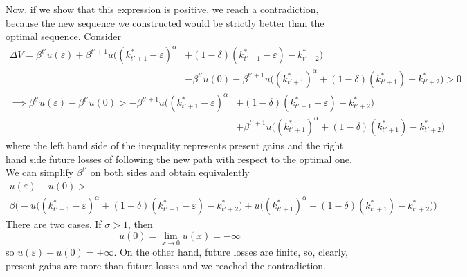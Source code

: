 Now, if we show that this expression is positive, we reach a contradiction, because the new sequence we constructed would be strictly better than the optimal sequence.
Consider
\begin{align*}
\Delta V = \beta ^{t'} u(\varepsilon) + \beta^{t' + 1}u \big((k_{t'+1}^* -\varepsilon)^\alpha &+ (1- \delta)(k_{t'+1}^* -\varepsilon) - k_{t' + 2}^*\big) \\& - \beta ^{t'} u(0) - \beta^{t' + 1}u \big((k_{t'+1}^*)^\alpha + (1- \delta)(k_{t'+1}^*) - k_{t' + 2}^*\big) > 0 \end{align*}\begin{align*}
\implies \beta ^{t'} u(\varepsilon) - \beta ^{t'} u(0)> - \beta^{t' + 1}u \big((k_{t'+1}^* -\varepsilon)^\alpha& + (1- \delta)(k_{t'+1}^* -\varepsilon) - k_{t' + 2}^*\big) \\ &+\beta^{t' + 1}u \big((k_{t'+1}^*)^\alpha + (1- \delta)(k_{t'+1}^*) - k_{t' + 2}^*\big)
\end{align*}
where the left hand side of the inequality represents present gains and the right hand side future losses of following the new path with respect to the optimal one. We can simplify $\beta^{t'}$ on both sides and obtain equivalently
\begin{equation}
\begin{split}
 u(\varepsilon) - u(0)>  \\\beta \Big( -u \big((k_{t'+1}^* -\varepsilon)^\alpha + (1- \delta)(k_{t'+1}^* -\varepsilon) - k_{t' + 2}^*\big) +u \big((k_{t'+1}^*)^\alpha + (1- \delta)(k_{t'+1}^*) - k_{t' + 2}^*\big) \Big)
 \end{split} \label{value_diff}
\end{equation}
There are two cases. If $\sigma > 1$, then $$u (0) = \lim_{x \to 0} u(x) = - \infty$$
so $u (\varepsilon) - u(0) = + \infty$. On the other hand, future losses are finite, so, clearly, present gains are more than future losses and we reached the contradiction.

